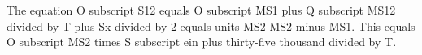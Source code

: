 The equation O subscript S12 equals O subscript MS1 plus Q subscript MS12 divided by T plus Sx divided by 2 equals units MS2 MS2 minus MS1. This equals O subscript MS2 times S subscript ein plus thirty-five thousand divided by T.
